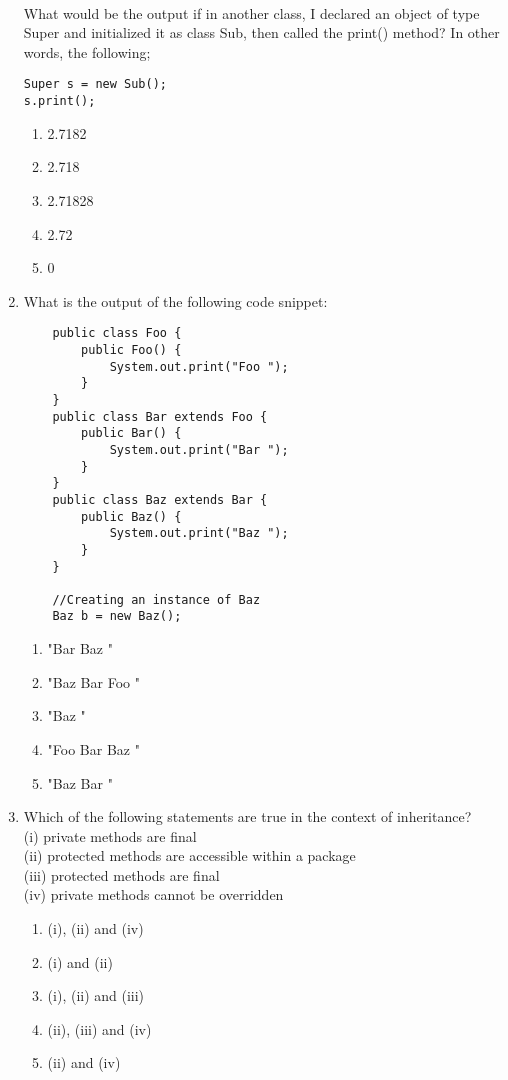 \documentclass[S17-Final.tex]{subfiles}
\begin{document}
\begin{enumerate}
\begin{lstlisting}
    
\end{lstlisting}
What would be the output if in another class, I declared an object of type Super and initialized it as class Sub, then called the print() method? In other words, the following;
\begin{lstlisting}
Super s = new Sub();
s.print();
\end{lstlisting}
\begin{enumerate}
\item  2.7182
\item  2.718
\item  2.71828 \ifdraft \Ans \fi 
\item  2.72
\item  0
\end{enumerate}
\clearpage
\item What is the output of the following code snippet:
\begin{lstlisting}
    public class Foo {
        public Foo() {
            System.out.print("Foo ");
        }
    }
    public class Bar extends Foo {
        public Bar() {
            System.out.print("Bar ");
        }
    } 
    public class Baz extends Bar {
        public Baz() {
            System.out.print("Baz ");
        }
    }
    
    //Creating an instance of Baz
    Baz b = new Baz();

\end{lstlisting}
	
\begin{enumerate}
\item  "Bar Baz "
\item  "Baz Bar Foo "
\item  "Baz "
\item  "Foo Bar Baz " \ifdraft \Ans \fi 
\item  "Baz Bar "
\end{enumerate}

\item Which of the following statements are true in the context of inheritance?\\

    (i) private methods are final\\
	(ii) protected methods are accessible within a package\\
	(iii) protected methods are final\\
	(iv) private methods cannot be overridden\\
	
\begin{enumerate}
\item  (i), (ii) and (iv) \ifdraft \Ans \fi 
\item  (i) and (ii)
\item  (i), (ii) and (iii)
\item  (ii), (iii) and (iv)
\item  (ii) and (iv)
\end{enumerate}


\end{enumerate}
\end{document}
